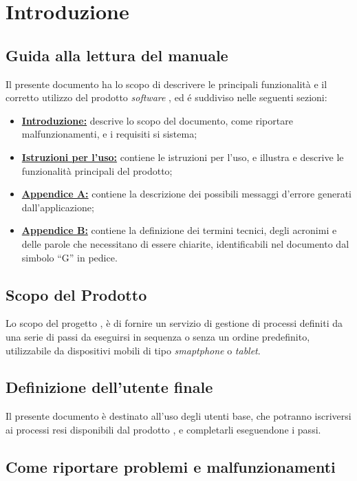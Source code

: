 \section{Introduzione}
\label{introduzione}
\subsection{Guida alla lettura del manuale}
Il presente documento ha lo scopo di descrivere le principali funzionalità e il corretto utilizzo del prodotto \textit{software} \progetto{}, ed é suddiviso nelle seguenti sezioni:

\begin{itemize}
\item \hyperref[introduzione]{\textbf{Introduzione:}} descrive lo scopo del documento, come riportare malfunzionamenti, e i requisiti si sistema;
\item \hyperref[istruzioni]{\textbf{Istruzioni per l'uso:}} contiene le istruzioni per l'uso, e illustra e descrive le funzionalità principali del prodotto;
\item \hyperref[errori]{\textbf{Appendice A:}} contiene la descrizione dei possibili messaggi d'errore generati dall'applicazione;
\item \hyperref[glossario]{\textbf{Appendice B:}} contiene la definizione dei termini tecnici, degli acronimi e delle parole che necessitano di essere chiarite, identificabili nel documento dal simbolo ``G'' in pedice.
\end{itemize}


\subsection{Scopo del Prodotto}
Lo scopo del progetto \progetto{}, è di fornire un servizio di gestione di processi definiti da una serie di passi da eseguirsi in sequenza o senza un ordine predefinito, utilizzabile da dispositivi mobili di tipo \textit{smaptphone} o \textit{tablet}.

\subsection{Definizione dell'utente finale}
Il presente documento è destinato all'uso degli utenti base, che potranno iscriversi ai processi resi disponibili dal prodotto \progetto{}, e completarli eseguendone i passi.

\subsection{Come riportare problemi e malfunzionamenti}

